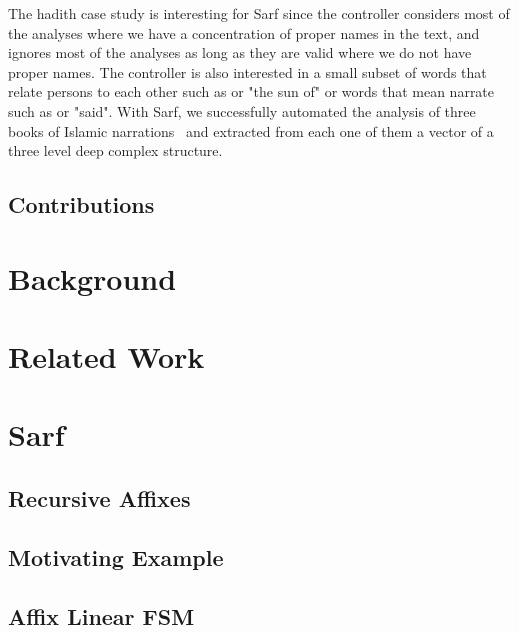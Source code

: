 \documentclass[11pt,letterpaper]{article}
\begin{document}
The hadith case study is interesting for Sarf since the controller
considers most of the analyses where we have a concentration
of proper names in the text, and ignores most of the analyses as long 
as they are valid where we do not have proper names. 
The controller is also interested in a small subset of words 
that relate persons to each other such as  or "the sun of" 
or words that mean narrate such as  or "said". 
With Sarf, we successfully automated the analysis of 
three books of Islamic narrations~\cite{narrations1,narrations2, narrations3}
and extracted from each one of them a vector of a three level deep
complex structure. 

\subsection{Contributions}




\section{Background}

\section{Related Work }

\section{Sarf}

\subsection{Recursive Affixes}

\subsection{Motivating Example}


\begin{figure*}[tb]
\end{figure*}


\subsection{Affix Linear FSM}
\end{document}
